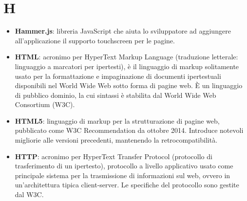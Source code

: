 \newpage
\section{H}

\begin{itemize}
	\item \textbf{Hammer.js}: libreria JavaScript che aiuta lo sviluppatore ad aggiungere all'applicazione il supporto touchscreen per le pagine.
	\item \textbf{HTML}: acronimo per HyperText Markup Language (traduzione letterale: linguaggio a marcatori per ipertesti), è il linguaggio di markup solitamente usato per la formattazione e impaginazione di documenti ipertestuali disponibili nel World Wide Web sotto forma di pagine web. È un linguaggio di pubblico dominio, la cui sintassi è stabilita dal World Wide Web Consortium (W3C).
	\item \textbf{HTML5}: linguaggio di markup per la strutturazione di pagine web, pubblicato come W3C Recommendation da ottobre 2014. Introduce notevoli migliorie alle versioni precedenti, mantenendo la retrocompatibilità.
	\item \textbf{HTTP}: acronimo per HyperText Transfer Protocol (protocollo di trasferimento di un ipertesto), protocollo a livello applicativo usato come principale sistema per la trasmissione di informazioni sul web, ovvero in un'architettura tipica client-server. Le specifiche del protocollo sono gestite dal W3C.
\end{itemize}
